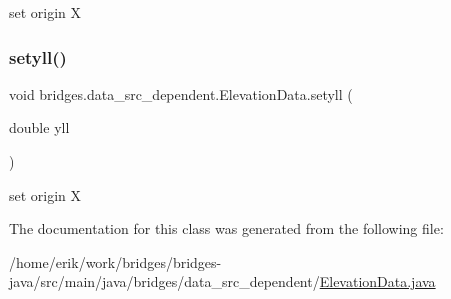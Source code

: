 set origin X \mbox{\label{classbridges_1_1data__src__dependent_1_1_elevation_data_a5a047e02c5d0acf9bf6d4b45086ae1cc}} 
\subsubsection{\texorpdfstring{setyll()}{setyll()}}
{\footnotesize\ttfamily void bridges.\+data\+\_\+src\+\_\+dependent.\+Elevation\+Data.\+setyll (\begin{DoxyParamCaption}\item[{double}]{yll }\end{DoxyParamCaption})}

set origin X 

The documentation for this class was generated from the following file\+:\begin{DoxyCompactItemize}
\item 
/home/erik/work/bridges/bridges-\/java/src/main/java/bridges/data\+\_\+src\+\_\+dependent/\hyperlink{_elevation_data_8java}{Elevation\+Data.\+java}\end{DoxyCompactItemize}
